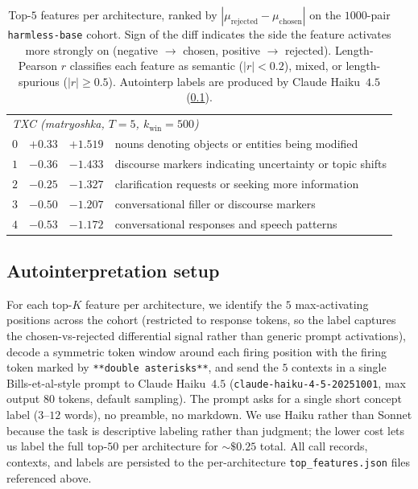 \begin{table}[t]
\begin{tabular}{l c c l}
        \midrule
        \multicolumn{4}{l}{\emph{TXC (matryoshka, $T=5$, $k_{\mathrm{win}}=500$)}} \\
        $0$ & $+0.33$ & $+1.519$ & nouns denoting objects or entities being modified \\
        $1$ & $-0.36$ & $-1.433$ & discourse markers indicating uncertainty or topic shifts \\
        $2$ & $-0.25$ & $-1.327$ & clarification requests or seeking more information \\
        $3$ & $-0.50$ & $-1.207$ & conversational filler or discourse markers \\
        $4$ & $-0.53$ & $-1.172$ & conversational responses and speech patterns \\
        \bottomrule
    \end{tabular}
    \caption{Top-$5$ features per architecture, ranked by $|\mu_{\mathrm{rejected}}-\mu_{\mathrm{chosen}}|$ on the $1000$-pair \texttt{harmless-base} cohort. Sign of the diff indicates the side the feature activates more strongly on (negative $\to$ chosen, positive $\to$ rejected). Length-Pearson $r$ classifies each feature as semantic ($|r|<0.2$), mixed, or length-spurious ($|r|\geq 0.5$). Autointerp labels are produced by Claude Haiku~$4.5$ (\cref{app:rlhf-autointerp}). }
    \label{tab:rlhf-top-features}
\end{table}

\subsection{Autointerpretation setup}
\label{app:rlhf-autointerp}

For each top-$K$ feature per architecture, we identify the $5$ max-activating positions across the cohort (restricted to response tokens, so the label captures the chosen-vs-rejected differential signal rather than generic prompt activations), decode a symmetric token window around each firing position with the firing token marked by \texttt{**double asterisks**}, and send the $5$ contexts in a single Bills-et-al-style \cite{bills2023language_autointerp} prompt to Claude Haiku~$4.5$ (\texttt{claude-haiku-4-5-20251001}, max output $80$ tokens, default sampling). The prompt asks for a single short concept label ($3$--$12$ words), no preamble, no markdown. We use Haiku rather than Sonnet because the task is descriptive labeling rather than judgment; the lower cost lets us label the full top-$50$ per architecture for $\sim\!\$0.25$ total. All call records, contexts, and labels are persisted to the per-architecture \texttt{top\_features.json} files referenced above.

